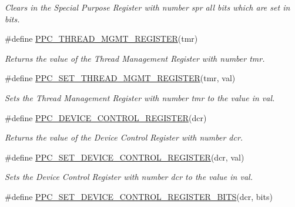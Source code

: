 \begin{DoxyCompactItemize}
\begin{DoxyCompactList}\small\item\em Clears in the Special Purpose Register with number {\itshape spr} all bits which are set in {\itshape bits}. \end{DoxyCompactList}\item 
\#define \mbox{\hyperlink{group__RTEMSBSPsPowerPCSharedUtility_gafcbb61249c0713163c2c490cfa6b5766}{P\+P\+C\+\_\+\+T\+H\+R\+E\+A\+D\+\_\+\+M\+G\+M\+T\+\_\+\+R\+E\+G\+I\+S\+T\+ER}}(tmr)
\begin{DoxyCompactList}\small\item\em Returns the value of the Thread Management Register with number {\itshape tmr}. \end{DoxyCompactList}\item 
\#define \mbox{\hyperlink{group__RTEMSBSPsPowerPCSharedUtility_ga90d0f8d8c6839c36fdf3054d86ed04a8}{P\+P\+C\+\_\+\+S\+E\+T\+\_\+\+T\+H\+R\+E\+A\+D\+\_\+\+M\+G\+M\+T\+\_\+\+R\+E\+G\+I\+S\+T\+ER}}(tmr,  val)
\begin{DoxyCompactList}\small\item\em Sets the Thread Management Register with number {\itshape tmr} to the value in {\itshape val}. \end{DoxyCompactList}\item 
\#define \mbox{\hyperlink{group__RTEMSBSPsPowerPCSharedUtility_gaf9d70263b9f91ca4aae512e6d9ac29e3}{P\+P\+C\+\_\+\+D\+E\+V\+I\+C\+E\+\_\+\+C\+O\+N\+T\+R\+O\+L\+\_\+\+R\+E\+G\+I\+S\+T\+ER}}(dcr)
\begin{DoxyCompactList}\small\item\em Returns the value of the Device Control Register with number {\itshape dcr}. \end{DoxyCompactList}\item 
\#define \mbox{\hyperlink{group__RTEMSBSPsPowerPCSharedUtility_ga22216346d9a84013ce035e303c09b9de}{P\+P\+C\+\_\+\+S\+E\+T\+\_\+\+D\+E\+V\+I\+C\+E\+\_\+\+C\+O\+N\+T\+R\+O\+L\+\_\+\+R\+E\+G\+I\+S\+T\+ER}}(dcr,  val)
\begin{DoxyCompactList}\small\item\em Sets the Device Control Register with number {\itshape dcr} to the value in {\itshape val}. \end{DoxyCompactList}\item 
\#define \mbox{\hyperlink{group__RTEMSBSPsPowerPCSharedUtility_ga9ebd69cadb130d05089b0bd98a05a8a7}{P\+P\+C\+\_\+\+S\+E\+T\+\_\+\+D\+E\+V\+I\+C\+E\+\_\+\+C\+O\+N\+T\+R\+O\+L\+\_\+\+R\+E\+G\+I\+S\+T\+E\+R\+\_\+\+B\+I\+TS}}(dcr,  bits)

\end{DoxyCompactItemize}
